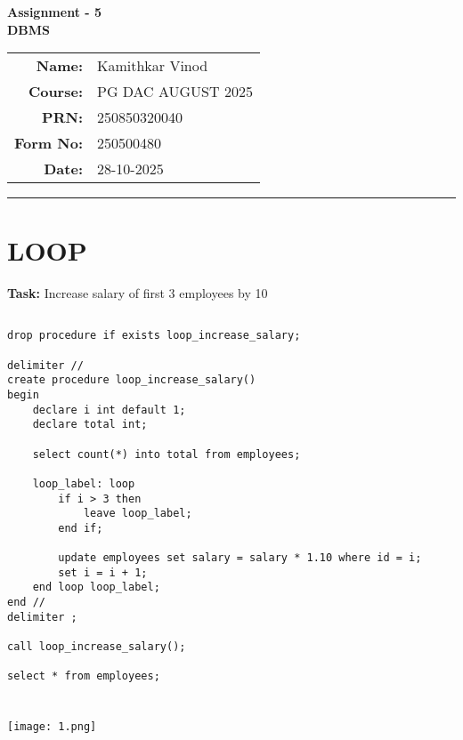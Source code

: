 \documentclass[12pt,a4paper]{article}
\begin{document}
\begin{center}
    \LARGE \textbf{Assignment - 5} \\[0.5cm]
    \Large \textbf{DBMS} \\[1cm]

    \begin{tabular}{rl}
        \textbf{Name:} & Kamithkar Vinod \\
        \textbf{Course:} & PG DAC AUGUST 2025 \\
        \textbf{PRN:} & 250850320040 \\
        \textbf{Form No:} & 250500480 \\
        \textbf{Date:} & 28-10-2025 \\
    \end{tabular}
\end{center}

\vspace{1cm}
\hrule
\vspace{0.5cm}


\section{LOOP}
\textbf{Task:} Increase salary of first 3 employees by 10%

\subsection{}
\begin{lstlisting}
drop procedure if exists loop_increase_salary;

delimiter //
create procedure loop_increase_salary() 
begin
    declare i int default 1;
    declare total int;

    select count(*) into total from employees;

    loop_label: loop
        if i > 3 then
            leave loop_label;
        end if;

        update employees set salary = salary * 1.10 where id = i;
        set i = i + 1;
    end loop loop_label;
end //
delimiter ;

call loop_increase_salary();

select * from employees;


\end{lstlisting}

\subsubsection{}
\begin{center}
    \texttt{[image: 1.png]}
\end{center}
\end{document}
